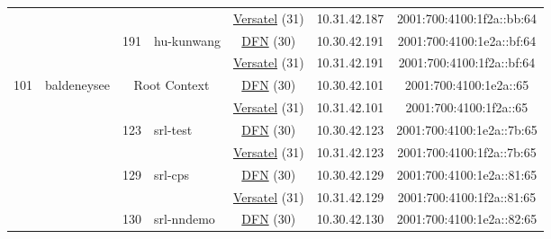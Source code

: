 \begin{small}
\begin{center}
\begin{longtable}{|c|c|c|c|c|c|c|c|}
  &  &  &  & \multicolumn{2}{|c|}{\tiny{\href{http://www.versatel.de}{Versatel} (31)}} & \tiny{10.31.42.187} & \tiny{2001:700:4100:1f2a::bb:64} \\* \cline{3-3}\cline{4-4}\cline{5-5}\cline{6-6}\cline{7-7}\cline{8-8}
  &  & \multirow{2}{*}{\tiny{191}} & \multicolumn{1}{|l|}{\multirow{2}{*}{\tiny{hu-kunwang}}} & \multicolumn{2}{|c|}{\tiny{\href{https://www.dfn.de}{DFN} (30)}} & \tiny{10.30.42.191} & \tiny{2001:700:4100:1e2a::bf:64} \\* \cline{5-5}\cline{6-6}\cline{7-7}\cline{8-8}
  &  &  &  & \multicolumn{2}{|c|}{\tiny{\href{http://www.versatel.de}{Versatel} (31)}} & \tiny{10.31.42.191} & \tiny{2001:700:4100:1f2a::bf:64} \\ \hline
 \multirow{40}{*}{\tiny{101}} & \multicolumn{1}{|l|}{\multirow{40}{*}{\tiny{baldeneysee}}} & \multicolumn{2}{|c|}{\multirow{2}{*}{\tiny{Root Context}}} & \multicolumn{2}{|c|}{\tiny{\href{https://www.dfn.de}{DFN} (30)}} & \tiny{10.30.42.101} & \tiny{2001:700:4100:1e2a::65} \\* \cline{5-5}\cline{6-6}\cline{7-7}\cline{8-8}
  &  & \multicolumn{2}{|c|}{} & \multicolumn{2}{|c|}{\tiny{\href{http://www.versatel.de}{Versatel} (31)}} & \tiny{10.31.42.101} & \tiny{2001:700:4100:1f2a::65} \\* \cline{3-3}\cline{4-4}\cline{5-5}\cline{6-6}\cline{7-7}\cline{8-8}
  &  & \multirow{2}{*}{\tiny{123}} & \multicolumn{1}{|l|}{\multirow{2}{*}{\tiny{srl-test}}} & \multicolumn{2}{|c|}{\tiny{\href{https://www.dfn.de}{DFN} (30)}} & \tiny{10.30.42.123} & \tiny{2001:700:4100:1e2a::7b:65} \\* \cline{5-5}\cline{6-6}\cline{7-7}\cline{8-8}
  &  &  &  & \multicolumn{2}{|c|}{\tiny{\href{http://www.versatel.de}{Versatel} (31)}} & \tiny{10.31.42.123} & \tiny{2001:700:4100:1f2a::7b:65} \\* \cline{3-3}\cline{4-4}\cline{5-5}\cline{6-6}\cline{7-7}\cline{8-8}
  &  & \multirow{2}{*}{\tiny{129}} & \multicolumn{1}{|l|}{\multirow{2}{*}{\tiny{srl-cps}}} & \multicolumn{2}{|c|}{\tiny{\href{https://www.dfn.de}{DFN} (30)}} & \tiny{10.30.42.129} & \tiny{2001:700:4100:1e2a::81:65} \\* \cline{5-5}\cline{6-6}\cline{7-7}\cline{8-8}
  &  &  &  & \multicolumn{2}{|c|}{\tiny{\href{http://www.versatel.de}{Versatel} (31)}} & \tiny{10.31.42.129} & \tiny{2001:700:4100:1f2a::81:65} \\* \cline{3-3}\cline{4-4}\cline{5-5}\cline{6-6}\cline{7-7}\cline{8-8}
  &  & \multirow{2}{*}{\tiny{130}} & \multicolumn{1}{|l|}{\multirow{2}{*}{\tiny{srl-nndemo}}} & \multicolumn{2}{|c|}{\tiny{\href{https://www.dfn.de}{DFN} (30)}} & \tiny{10.30.42.130} & \tiny{2001:700:4100:1e2a::82:65} \\* \cline{5-5}\cline{6-6}\cline{7-7}\cline{8-8}

\end{longtable}
\end{center}
\end{small}
